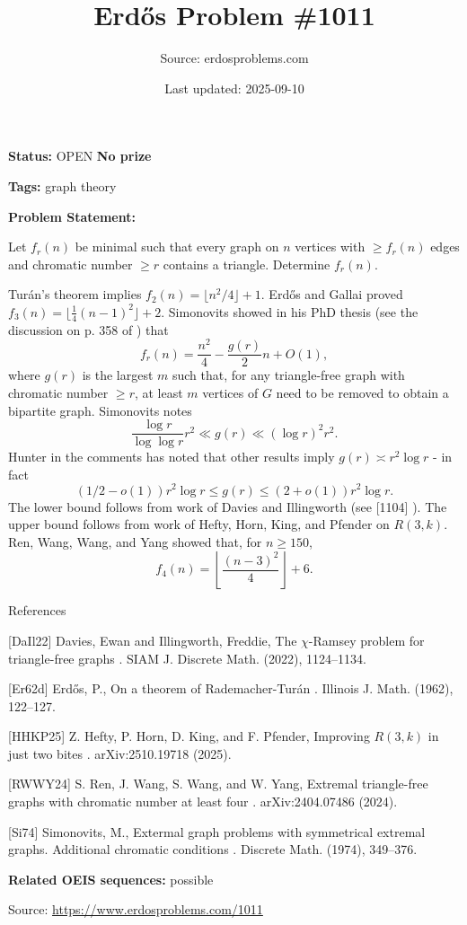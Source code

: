 \documentclass{article}
\title{Erd\H{o}s Problem \#1011}
\date{Last updated: 2025-09-10}
\author{Source: erdosproblems.com}
\begin{document}
\maketitle

\noindent\textbf{Status:} OPEN \quad \textbf{No prize}

\noindent\textbf{Tags:} graph theory

\medskip

\noindent\textbf{Problem Statement:}

Let $f_r(n)$ be minimal such that every graph on $n$ vertices with $\geq f_r(n)$ edges and chromatic number $\geq r$ contains a triangle. Determine $f_r(n)$.




Tur\'{a}n's theorem implies $f_2(n)=\lfloor n^2/4\rfloor+1$. Erd\H{o}s and Gallai \cite{Er62d} proved $f_3(n)=\lfloor \frac{1}{4}(n-1)^2\rfloor+2$. Simonovits showed in his PhD thesis (see the discussion on p. 358 of \cite{Si74}) that\[f_r(n)=\frac{n^2}{4}-\frac{g(r)}{2}{n}+O(1),\]where $g(r)$ is the largest $m$ such that, for any triangle-free graph with chromatic number $\geq r$, at least $m$ vertices of $G$ need to be removed to obtain a bipartite graph. Simonovits \cite{Si74} notes\[\frac{\log r}{\log\log r}r^2 \ll g(r) \ll (\log r)^2r^2.\]Hunter in the comments has noted that other results imply $g(r)\asymp r^2\log r$ - in fact\[(1/2-o(1))r^2\log r\leq g(r)\leq (2+o(1))r^2\log r.\]The lower bound follows from work of Davies and Illingworth \cite{DaIl22} (see [1104] ). The upper bound follows from work of Hefty, Horn, King, and Pfender \cite{HHKP25} on $R(3,k)$. Ren, Wang, Wang, and Yang \cite{RWWY24} showed that, for $n\geq 150$,\[f_4(n)=\left\lfloor\frac{(n-3)^2}{4}\right\rfloor+6.\]




References

[DaIl22] Davies, Ewan and Illingworth, Freddie, The {$\chi$}-{R}amsey problem for triangle-free graphs . SIAM J. Discrete Math. (2022), 1124--1134.

[Er62d] Erd\H{o}s, P., On a theorem of {R}ademacher-Tur\'{a}n . Illinois J. Math. (1962), 122--127.

[HHKP25] Z. Hefty, P. Horn, D. King, and F. Pfender, Improving $R(3,k)$ in just two bites . arXiv:2510.19718 (2025).

[RWWY24] S. Ren, J. Wang, S. Wang, and W. Yang, Extremal triangle-free graphs with chromatic number at least four . arXiv:2404.07486 (2024).

[Si74] Simonovits, M., Extermal graph problems with symmetrical extremal graphs. {A}dditional chromatic conditions . Discrete Math. (1974), 349--376.

\noindent\textbf{Related OEIS sequences:} possible


\bigskip
\noindent\small{Source: \url{https://www.erdosproblems.com/1011}}
\end{document}
